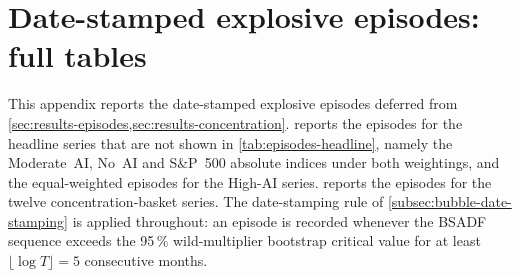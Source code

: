 
\section{Date-stamped explosive episodes: full tables}
\label{app:episodes-full}
 
This appendix reports the date-stamped explosive episodes deferred from \cref{sec:results-episodes,sec:results-concentration}.  reports the episodes for the headline series that are not shown in \cref{tab:episodes-headline}, namely the Moderate~AI, No~AI and S\&P~500 absolute indices under both weightings, and the equal-weighted episodes for the High-AI series.  reports the episodes for the twelve concentration-basket series. The date-stamping rule of \cref{subsec:bubble-date-stamping} is applied throughout: an episode is recorded whenever the BSADF sequence exceeds the 95\,\% wild-multiplier bootstrap critical value for at least $\lfloor \log T \rfloor = 5$ consecutive months.
 
